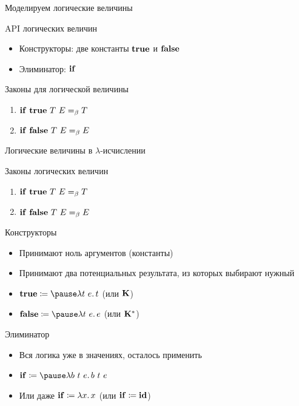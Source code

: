     \begin{frame}{Моделируем логические величины}
        \pause
        \begin{block}{API логических величин}
            \begin{itemize}
                \item Конструкторы: две константы $\mathbf{true}$ и $\mathbf{false}$
                \item Элиминатор: $\mathbf{if}$
            \end{itemize}
        \end{block}
        \pause
        \begin{block}{Законы для логической величины}
            \begin{enumerate}
                \item $\mathbf{if} ~ \mathbf{true} ~ T ~ E =_\beta T$
                \item $\mathbf{if} ~ \mathbf{false} ~ T ~ E =_\beta E$
            \end{enumerate}
        \end{block}
    \end{frame}

    \begin{frame}{Логические величины в $\lambda$-исчислении}
        \begin{block}{Законы логических величин}
            \begin{enumerate}
                \item $\mathbf{if} ~ \mathbf{true} ~ T ~ E =_\beta T$
                \item $\mathbf{if} ~ \mathbf{false} ~ T ~ E =_\beta E$
            \end{enumerate}
        \end{block}
        \pause
        \begin{block}{Конструкторы}
            \begin{itemize}
                \item Принимают ноль аргументов (константы)
                \item Принимают два потенциальных результата, из которых выбирают нужный
                \item $\term{true} \termdef \pause \lambda t~e \ldotp t$ (или $\mathbf{K}$)
                \item $\term{false} \termdef \pause \lambda t~e \ldotp e$ (или $\mathbf{K}^*$)
            \end{itemize}
        \end{block}
        \pause
        \begin{block}{Элиминатор}
            \begin{itemize}
                \item Вся логика уже в значениях, осталось применить
                \item $\term{if} \termdef \pause \lambda b~t~e\ldotp b \ap t \ap e$
                \item Или даже $\mathbf{if} \coloneqq \lambda x \ldotp x$ (или $\mathbf{if} \coloneqq \mathbf{id}$)
            \end{itemize}
        \end{block}
    \end{frame}

